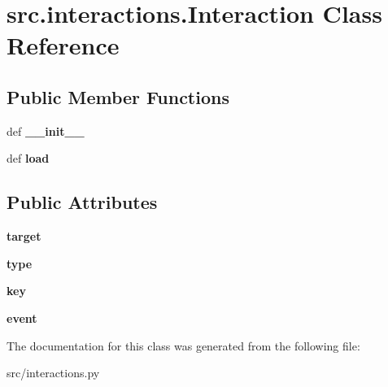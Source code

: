 \hypertarget{classsrc_1_1interactions_1_1_interaction}{\section{src.\-interactions.\-Interaction \-Class \-Reference}
\label{classsrc_1_1interactions_1_1_interaction}
}
\subsection*{\-Public \-Member \-Functions}
\begin{DoxyCompactItemize}
\item 
\hypertarget{classsrc_1_1interactions_1_1_interaction_a97a1759e258a88c8b6e31e1afde852b9}{def {\bfseries \-\_\-\-\_\-init\-\_\-\-\_\-}}\label{classsrc_1_1interactions_1_1_interaction_a97a1759e258a88c8b6e31e1afde852b9}

\item 
\hypertarget{classsrc_1_1interactions_1_1_interaction_a96ccab0afe3e927e94f5c39fe1b59cfc}{def {\bfseries load}}\label{classsrc_1_1interactions_1_1_interaction_a96ccab0afe3e927e94f5c39fe1b59cfc}

\end{DoxyCompactItemize}
\subsection*{\-Public \-Attributes}
\begin{DoxyCompactItemize}
\item 
\hypertarget{classsrc_1_1interactions_1_1_interaction_ad577ad6550f3bad2cf45192bcdd2d659}{{\bfseries target}}\label{classsrc_1_1interactions_1_1_interaction_ad577ad6550f3bad2cf45192bcdd2d659}

\item 
\hypertarget{classsrc_1_1interactions_1_1_interaction_a455988c49a2625914d11e97e0b1b9285}{{\bfseries type}}\label{classsrc_1_1interactions_1_1_interaction_a455988c49a2625914d11e97e0b1b9285}

\item 
\hypertarget{classsrc_1_1interactions_1_1_interaction_ae0115c68842371d5c28d85f2234c9d4b}{{\bfseries key}}\label{classsrc_1_1interactions_1_1_interaction_ae0115c68842371d5c28d85f2234c9d4b}

\item 
\hypertarget{classsrc_1_1interactions_1_1_interaction_aec1ad3a52431ab38496a0ce83a21b7f1}{{\bfseries event}}\label{classsrc_1_1interactions_1_1_interaction_aec1ad3a52431ab38496a0ce83a21b7f1}

\end{DoxyCompactItemize}


\-The documentation for this class was generated from the following file\-:\begin{DoxyCompactItemize}
\item 
src/interactions.\-py\end{DoxyCompactItemize}
